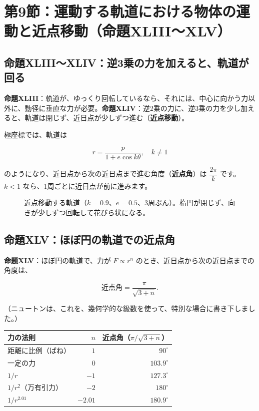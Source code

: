 \documentclass[a4paper,11pt,openany]{ltjsbook}
\begin{document}
\section{第9節：運動する軌道における物体の運動と近点移動（命題XLIII〜XLV）}

\subsection{命題XLIII〜XLIV：逆3乗の力を加えると、軌道が回る}

\textbf{命題XLIII}：軌道が、ゆっくり回転しているなら、それには、中心に向かう力以外に、動径に垂直な力が必要。\textbf{命題XLIV}：逆2乗の力に、逆3乗の力を少し加えると、軌道は閉じず、近日点が少しずつ進む（\textbf{近点移動}）。

極座標では、軌道は

\[
r=\frac{p}{1+e\cos k\theta},\quad k\ne1
\]

のようになり、近日点から次の近日点まで進む角度（\textbf{近点角}）は $\dfrac{2\pi}{k}$ です。$k<1$ なら、1周ごとに近日点が前に進みます。

\begin{figure}[htbp]
\centering
{}
\caption{近点移動する軌道（$k=0.9$、$e=0.5$、3周ぶん）。楕円が閉じず、向きが少しずつ回転して花びら状になる。}
\end{figure}

\subsection{命題XLV：ほぼ円の軌道での近点角}

\textbf{命題XLV}：ほぼ円の軌道で、力が $F\propto r^n$ のとき、近日点から次の近日点までの角度は、

\[
\text{近点角}=\frac{\pi}{\sqrt{3+n}}.
\]

（ニュートンは、これを、幾何学的な級数を使って、特別な場合に書き下しました。）

\begin{center}
\begin{tabular}{lrr}
\toprule
力の法則 & $n$ & 近点角（$\pi/\sqrt{3+n}$）\\
\midrule
距離に比例（ばね） & $1$ & $90^\circ$\\
一定の力 & $0$ & $103.9^\circ$\\
$1/r$ & $-1$ & $127.3^\circ$\\
$1/r^2$（万有引力） & $-2$ & $180^\circ$\\
$1/r^{2.01}$ & $-2.01$ & $180.9^\circ$\\
\bottomrule
\end{tabular}
\end{center}
\end{document}
